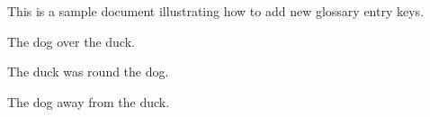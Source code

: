\documentclass{article}
\begin{document}
This is a sample document illustrating how to add new glossary entry
keys.

The dog  over the duck.

The duck was  round the dog.

The dog  away from the duck.

\printglossaries
\end{document}

